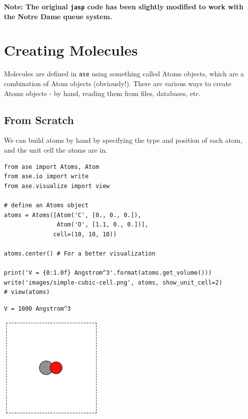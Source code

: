 \documentclass[11pt]{article}
\begin{document}
\textbf{Note: The original \texttt{jasp} code has been slightly modified to work with the Notre Dame queue system.}


\section{Creating Molecules}
\label{sec-4}

Molecules are defined in \texttt{ase} using something called Atoms objects, which are a combination of Atom objects (obviously!). There are various ways to create Atoms objects - by hand, reading them from files, databases, etc.

\subsection{From Scratch}
\label{sec-4-1}

We can build atoms by hand by specifying the type and position of each atom, and the unit cell the atoms are in.

\begin{verbatim}
from ase import Atoms, Atom
from ase.io import write
from ase.visualize import view

# define an Atoms object
atoms = Atoms([Atom('C', [0., 0., 0.]),
               Atom('O', [1.1, 0., 0.])],
              cell=(10, 10, 10))

atoms.center() # For a better visualization

print('V = {0:1.0f} Angstrom^3'.format(atoms.get_volume()))
write('images/simple-cubic-cell.png', atoms, show_unit_cell=2)
# view(atoms)
\end{verbatim}

\begin{verbatim}
V = 1000 Angstrom^3
\end{verbatim}

\includegraphics[width=2in]{./images/simple-cubic-cell.png}
\end{document}
